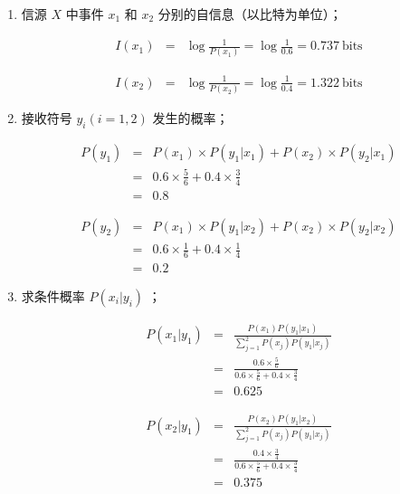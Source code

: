 \documentclass[onecolumn,oneside]{BUPTHomework}
\begin{document}
  \begin{solution}
  {
    \begin{enumerate}
      \item 信源 $X$ 中事件 $x_1$ 和 $x_2$ 分别的自信息（以比特为单位）；
      
      \begin{eqnarray} 
        I(x_1) &=& \log \frac{1}{P(x_1)} = \log \frac{1}{0.6} = 0.737\ \mbox{bits} \nonumber
      \end{eqnarray}
      
      \begin{eqnarray} 
        I(x_2) &=& \log \frac{1}{P(x_2)} = \log \frac{1}{0.4} = 1.322\ \mbox{bits} \nonumber
      \end{eqnarray}

      \item 接收符号 $y_i(i=1,2)$ 发生的概率；
      
      \begin{eqnarray} 
        P(y_1) &=& P(x_1) \times P(y_1 \vert x_1) + P(x_2) \times P(y_2 \vert x_1) \nonumber \\
        &=& 0.6 \times \frac{5}{6} + 0.4 \times \frac{3}{4} \nonumber \\
        &=& 0.8 \nonumber
      \end{eqnarray}

      \begin{eqnarray} 
        P(y_2) &=& P(x_1) \times P(y_1 \vert x_2) + P(x_2) \times P(y_2 \vert x_2) \nonumber \\
        &=& 0.6 \times \frac{1}{6} + 0.4 \times \frac{1}{4} \nonumber \\
        &=& 0.2 \nonumber 
      \end{eqnarray}

      \item 求条件概率 $P(x_i \vert y_i)$ ；
      
      \begin{eqnarray} 
        P(x_1 \vert y_1) &=& \frac{P(x_1)P(y_1 \vert x_1)}{\sum_{j=1}^2P(x_j)P(y_1 \vert x_j)} \nonumber \\
        &=& \frac{0.6 \times \frac{5}{6}}{0.6 \times \frac{5}{6} + 0.4 \times \frac{3}{4}} \nonumber \\
        &=& 0.625 \nonumber
      \end{eqnarray}

      \begin{eqnarray} 
        P(x_2 \vert y_1) &=& \frac{P(x_2)P(y_1 \vert x_2)}{\sum_{j=1}^2P(x_j)P(y_1 \vert x_j)} \nonumber \\
        &=& \frac{0.4 \times \frac{3}{4}}{0.6 \times \frac{5}{6} + 0.4 \times \frac{3}{4}} \nonumber \\
        &=& 0.375 \nonumber
      \end{eqnarray}


\end{enumerate}}
\end{solution}
\end{document}

